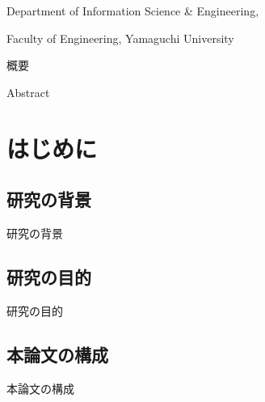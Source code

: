 \documentclass[11pt,a4j]{jreport}
\begin{document}
    \begin{center}
      {\LARGE {} \par} 
      {\large Department of Information Science \& Engineering, \par}
      {\large Faculty of Engineering, Yamaguchi University \par}
    \end{center}

  \newpage




  \thispagestyle{empty}
  \begin{center}
    \LARGE {}
  \end{center}
  概要
  \begin{center}
    \LARGE {}
  \end{center}
  Abstract

  \newpage




  {
    \makeatletter
    \let\ps@jpl@in\ps@empty
    \makeatother
    \pagestyle{empty}
    \tableofcontents
    \newpage
  }

  
  \lhead{\rightmark}
  \renewcommand{\chaptermark}[1]{
    \markboth{第\ \normalfont\thechapter\ 章~~#1}{}
  }




  \setcounter{page}{1} %




  \chapter{はじめに}
    \section{研究の背景}
      研究の背景
    \section{研究の目的}
      研究の目的
    \section{本論文の構成}
      本論文の構成
  \newpage
\end{document}

